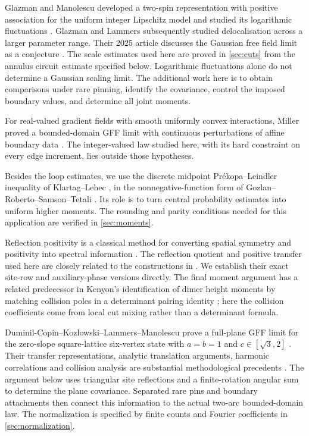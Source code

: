 Glazman and Manolescu developed a two-spin representation with positive
association for the uniform integer Lipschitz model and studied its
logarithmic fluctuations \cite{GM2021}.  Glazman and Lammers subsequently
studied delocalisation across a larger parameter range.  Their 2025 article
discusses the Gaussian free field limit as a conjecture
\cite[Section~1.2.4]{GL2025}.  The scale estimates used here are proved in
\cref{sec:cuts} from the annulus circuit estimate specified below.
Logarithmic fluctuations alone do not determine a Gaussian scaling limit.
The additional work here is to obtain comparisons under rare pinning,
identify the covariance, control the imposed boundary values, and determine
all joint moments.

For real-valued gradient fields with smooth uniformly convex interactions,
Miller proved a bounded-domain GFF limit with continuous perturbations of
affine boundary data \cite[Theorem~1.1]{Miller2011}.  The integer-valued law
studied here, with its hard constraint on every edge increment, lies outside
those hypotheses.

Besides the loop estimates, we use the discrete midpoint
Pr\'ekopa--Leindler inequality of Klartag--Lehec
\cite[Theorem~1.4]{KlartagLehec2019}, in the nonnegative-function form of
Gozlan--Roberto--Samson--Tetali \cite[Theorem~3]{GRST2019}.  Its role is to
turn central probability estimates into uniform higher moments.  The
rounding and parity conditions needed for this application are verified
in \cref{sec:moments}.

Reflection positivity is a classical method for converting spatial
symmetry and positivity into spectral information
\cite{FILS1978}.  The reflection quotient and positive transfer used here
are closely related to the constructions in
\cite[Sections~3.1--3.3 and 4.1]{Usui2012}.  We establish their exact
site-row and auxiliary-phase versions directly.  The final moment
argument has a related predecessor in Kenyon's identification of dimer
height moments by matching collision poles in a determinant pairing identity
\cite[Lemma~3.1 and Proposition~3.2]{Kenyon2001}; here the collision
coefficients come from local cut mixing rather than a determinant formula.

Duminil-Copin--Kozlowski--Lammers--Manolescu prove a full-plane GFF limit
for the zero-slope square-lattice six-vertex state with
$a=b=1$ and $c\in[\sqrt3,2]$
\cite[Theorems~2.2 and 2.8]{DCKLM2026}.  Their transfer representations,
analytic translation arguments, harmonic correlations and collision
analysis are substantial methodological precedents
\cite[Theorems~4.12 and 4.15; Sections~7--9]{DCKLM2026}.
The argument below uses triangular site reflections and a finite-rotation
angular sum to determine the plane covariance.  Separated rare pins and
boundary attachments then connect this information to the actual
two-arc bounded-domain law.  The normalization is specified by finite
counts and Fourier coefficients in \cref{sec:normalization}.

